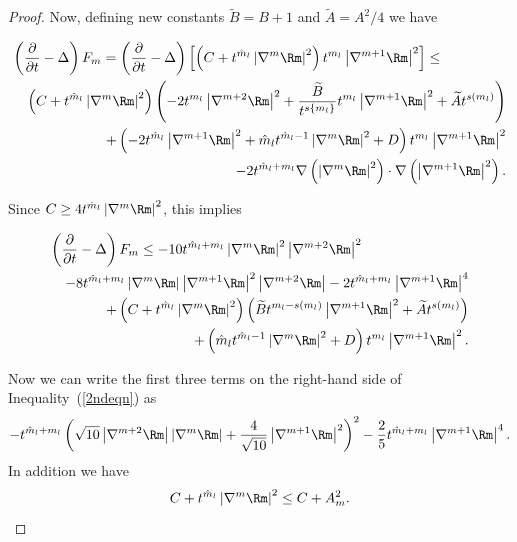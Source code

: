 \begin{proof}
Now, defining new constants $\widetilde B=B+1$ and $\widetilde
A=A^2/4$ we have

\begin{eqnarray*}
\lefteqn{ \left(  \frac{\partial}{\partial t}-\Delta\right)F_m=
\left( \frac{\partial}{\partial t}-\Delta\right)  \left[ \left(
C+t^{\hat{m}_l  }\left\vert \nabla^{m}\Rm \right\vert
^{2}\right)  t^{m_l }\left\vert
\nabla^{m+1}\Rm\right\vert ^{2}\right]  \leq}   \\
& & \left(  C+t^{\hat{m}_l  }\left\vert \nabla^{m}
\Rm\right\vert ^{2}\right)  \left( -2t^{m_l
}\left\vert \nabla^{m+2} \Rm \right\vert ^{2}
+\frac{\widetilde B}{t^{s\{m_l\}}} t^{m_l}\left\vert \nabla^{m+1}
\Rm \right\vert ^{2}+\widetilde At^{s(m_l)} \right) \\
& &  +\left( -2t^{\hat{m}_l }\left\vert
\nabla^{m+1}\Rm \right\vert ^{2} +\hat{m}_l
t^{\hat{m}_l  -1}\left\vert \nabla^{m}\Rm\right\vert
^{2}+D \right) t^{m_
l} \left\vert \nabla^{m+1} \Rm\right\vert ^{2}\\
& &  -2t^{\hat{m}_l  +m_l } \nabla\left(\left\vert
\nabla^{m}\Rm\right\vert ^{2}\right)\cdot
\nabla\left(\left\vert \nabla^{m+1}\Rm\right\vert
^{2}\right). \end{eqnarray*}

Since $C\ge 4t^{\hat
m_l}\left\vert\nabla^m\Rm\right\vert^2$, this implies

\begin{eqnarray}
\lefteqn{ \left(  \frac{\partial}{\partial t}-\Delta\right) F_m \leq
-10t^{\hat{m}_l  +m_l} \left\vert
\nabla^{m}\Rm\right\vert ^{2}\left\vert
\nabla^{m+2}\Rm\right\vert ^{2}}\label{2ndeqn}\\
 & & -8t^{\hat{m}_l  +m_l  }\left\vert
\nabla^{m}\Rm\right\vert \left\vert \nabla^{m+1}%
\Rm\right\vert ^{2}\left\vert \nabla^{m+2}\Rm%
\right\vert  -2t^{\hat m_l  +m_l  }\left\vert
\nabla^{m+1}\Rm\right\vert ^{4}\nonumber\\
 & & +\left(  C+t^{\hat m_l}\left\vert \nabla^{m}
\Rm\right\vert ^{2}\right)  \left( \widetilde
Bt^{m_l-s(m_l) }\left\vert \nabla^{m+1}\Rm\right\vert
^{2}+\widetilde At^{s(m_l)}\right) \nonumber\\
 & & +\left(\hat m_l  t^{\hat{m}_l -1}\left\vert
\nabla^{m}\Rm\right\vert ^{2}+D\right) t^{m_l
}\left\vert \nabla^{m+1}\Rm \right\vert
^{2}.\nonumber
\end{eqnarray}

Now we can write the first three terms on the right-hand side of
Inequality~(\ref{2ndeqn}) as \begin{equation}\label{3rdeqn} -t^{\hat
m_l+m_l}\left(\sqrt{10}\left\vert\nabla^{m+2}\Rm\right\vert
\left\vert\nabla^m\Rm\right\vert+\frac{4}{\sqrt{10}}\left\vert\nabla^{m+1}
\Rm\right\vert^2\right)^2-\frac{2}{5}t^{\hat
m_l+m_l}\left\vert\nabla^{m+1}\Rm\right\vert^4.\end{equation}
In addition we have
\begin{equation}\label{4theqn}
C+t^{\hat m_l}\left\vert \nabla^{m} \Rm\right\vert
^{2}  \leq  C+A_m^2.
\end{equation}


\end{proof}
